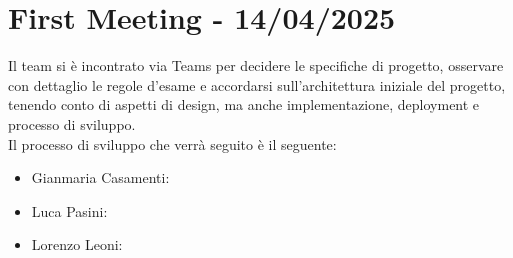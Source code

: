 
\section*{First Meeting - 14/04/2025}
Il team si è incontrato via Teams per decidere le specifiche di progetto, osservare con dettaglio le regole d'esame e
accordarsi sull'architettura iniziale del progetto, tenendo conto di aspetti di design, ma anche implementazione,
deployment e processo di sviluppo.\\
Il processo di sviluppo che verrà seguito è il seguente:
\begin{itemize}
    \item Gianmaria Casamenti:
    \item Luca Pasini:
    \item Lorenzo Leoni:
\end{itemize}

\newpage